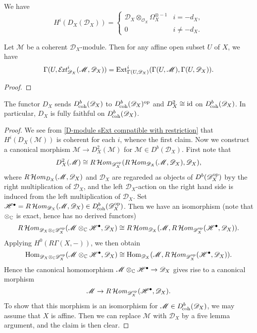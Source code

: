 \begin{example}
We have 
\[H^i(D_X(\mathscr{D}_X))=\begin{cases}
\mathscr{D}_X\otimes_{\mathscr{O}_X}\Omega_X^{\otimes-1}&i=-d_X,\\
0&i\neq -d_X.
\end{cases}\]
\end{example}

\begin{lemma}\label{D-module sExt compatible with restriction}
Let $\mathscr{M}$ be a coherent $\mathscr{D}_X$-module. Then for any affine open subset $U$ of $X$, we have
\[\Gamma(U,\operatorname{\mathcal{E}\hspace*{-1.3pt}\textit{xt}\hspace{0.5pt}}_{\mathscr{D}_X}^i(\mathscr{M},\mathscr{D}_X))=\mathrm{Ext}_{\Gamma(U,\mathscr{D}_X)}^i(\Gamma(U,\mathscr{M}),\Gamma(U,\mathscr{D}_X)).\]
\end{lemma}
\begin{proof}

\end{proof}

\begin{proposition}\label{D-module dual functor involutive prop}
The functor $D_X$ sends $D_{\!\mathrm{coh}}^b(\mathscr{D}_X)$ to $D^b_{\!\mathrm{coh}}(\mathscr{D}_X)^{\mathrm{op}}$ and $D_X^2\cong\operatorname{id}$ on $D_{\!\mathrm{coh}}^b(\mathscr{D}_X)$. In particular, $D_X$ is fully faithful on $D_{\!\mathrm{coh}}^b(\mathscr{D}_X)$.
\end{proposition}
\begin{proof}
We see from \cref{D-module sExt compatible with restriction} that $H^i(D_X(\mathscr{M}))$ is coherent for each $i$, whence the first claim. Now we construct a canonical morphism $\mathscr{M}\to D_X^2(\mathscr{M})$ for $\mathscr{M}\in D^b(\mathscr{D}_X)$. First note that
\[D_X^2(\mathscr{M})\cong R\operatorname{\mathcal{H}\hspace*{-0.4pt}\textit{om}\hspace{0.5pt}}_{\mathscr{D}_X^{\mathrm{op}}}(R\operatorname{\mathcal{H}\hspace*{-0.4pt}\textit{om}\hspace{0.5pt}}_{\mathscr{D}_X}(\mathscr{M},\mathscr{D}_X),\mathscr{D}_X),\]
where $R\operatorname{\mathcal{H}\hspace*{-0.4pt}\textit{om}\hspace{0.5pt}}_{D_X}(\mathscr{M},\mathscr{D}_X)$ and $\mathscr{D}_X$ are regareded as objects of $D^b(\mathscr{D}_X^{\mathrm{op}})$ byy the right multiplication of $\mathscr{D}_X$, and the left $\mathscr{D}_X$-action on the right hand side is induced from the left multiplication of $\mathscr{D}_X$. Set $\mathscr{H}^\bullet=R\operatorname{\mathcal{H}\hspace*{-0.4pt}\textit{om}\hspace{0.5pt}}_{\mathscr{D}_X}(\mathscr{M},\mathscr{D}_X)\in D^b_{\!\mathrm{coh}}(\mathscr{D}_X^{\mathrm{op}})$. Then we have an isomorphism (note that $\otimes_{\mathbb{C}}$ is exact, hence has no derived functors)
\[R\operatorname{\mathcal{H}\hspace*{-0.4pt}\textit{om}\hspace{0.5pt}}_{\mathscr{D}_X\otimes_{\mathbb{C}}\mathscr{D}_X^{\mathrm{op}}}(\mathscr{M}\otimes_{\mathbb{C}}\mathscr{H}^\bullet,\mathscr{D}_X)\cong R\operatorname{\mathcal{H}\hspace*{-0.4pt}\textit{om}\hspace{0.5pt}}_{\mathscr{D}_X}(\mathscr{M},R\operatorname{\mathcal{H}\hspace*{-0.4pt}\textit{om}\hspace{0.5pt}}_{\mathscr{D}_X^{\mathrm{op}}}(\mathscr{H}^\bullet,\mathscr{D}_X)).\]
Applying $H^0(R\Gamma(X,-))$, we then obtain
\[\mathrm{Hom}_{\mathscr{D}_X\otimes_{\mathbb{C}}\mathscr{D}_X^{\mathrm{op}}}(\mathscr{M}\otimes_{\mathbb{C}}\mathscr{H}^\bullet,\mathscr{D}_X)\cong \mathrm{Hom}_{\mathscr{D}_X}(\mathscr{M},R\operatorname{\mathcal{H}\hspace*{-0.4pt}\textit{om}\hspace{0.5pt}}_{\mathscr{D}_X^{\mathrm{op}}}(\mathscr{H}^\bullet,\mathscr{D}_X)).\]
Hence the canonical homomorphism $\mathscr{M}\otimes_{\mathbb{C}}\mathscr{H}^\bullet\to\mathscr{D}_X$ gives rise to a canonical morphism
\[\mathscr{M}\to R\operatorname{\mathcal{H}\hspace*{-0.4pt}\textit{om}\hspace{0.5pt}}_{\mathscr{D}_X^{\mathrm{op}}}(\mathscr{H}^\bullet,\mathscr{D}_X).\]
To show that this morphism is an isomorphism for $\mathscr{M}\in D_{\!\mathrm{coh}}^b(\mathscr{D}_X)$, we may assume that $X$ is affine. Then we can replace $\mathscr{M}$ with $\mathscr{D}_X$ by a five lemma argument, and the claim is then clear.
\end{proof}

